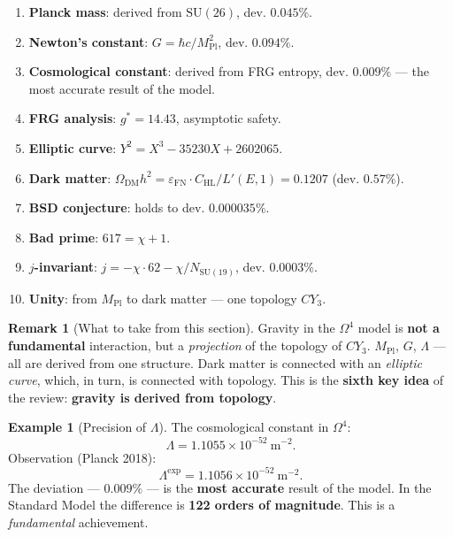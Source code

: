 \documentclass[11pt,a4paper]{article}
\newcommand{\SU}{\mathrm{SU}}
\newcommand{\CY}{CY_3}
\newcommand{\Om}{\Omega^4}
\newcommand{\Mpl}{M_{\text{Pl}}}
\newcommand{\epsFN}{\varepsilon_{\text{FN}}}
\theoremstyle{definition}
\newtheorem{remark}[theorem]{Remark}
\newtheorem{example}[theorem]{Example}
\begin{document}
\begin{enumerate}
    \item \textbf{Planck mass}: derived from $\SU(26)$, 
          dev. $0.045\%$.
    \item \textbf{Newton's constant}: $G = \hbar c/\Mpl^2$, 
          dev. $0.094\%$.
    \item \textbf{Cosmological constant}: derived from 
          FRG entropy, dev. $\mathbf{0.009\%}$ — the most accurate 
          result of the model.
    \item \textbf{FRG analysis}: $g^* = 14.43$, asymptotic 
          safety.
    \item \textbf{Elliptic curve}: 
          $Y^2 = X^3 - 35230X + 2602065$.
    \item \textbf{Dark matter}: $\Omega_{\text{DM}} h^2 
          = \epsFN \cdot C_{\text{HL}}/L'(E,1) = 0.1207$ 
          (dev. $0.57\%$).
    \item \textbf{BSD conjecture}: holds to dev. $0.000035\%$.
    \item \textbf{Bad prime}: $617 = \chi + 1$.
    \item \textbf{$j$-invariant}: 
          $j = -\chi \cdot 62 - \chi/N_{\SU(19)}$, dev. $0.0003\%$.
    \item \textbf{Unity}: from $\Mpl$ to dark matter — 
          one topology $\CY$.
\end{enumerate}

\begin{remark}[What to take from this section]
\label{rem:gravity-takeaway}
Gravity in the $\Om$ model is \textbf{not a fundamental} 
interaction, but a \emph{projection} of the topology of $\CY$. 
$\Mpl$, $G$, $\Lambda$ — all are derived from one structure. 
Dark matter is connected with an \emph{elliptic curve}, which, 
in turn, is connected with topology. This is the \textbf{sixth 
key idea} of the review: \textbf{gravity is derived 
from topology}.
\end{remark}

\begin{example}[Precision of $\Lambda$]
\label{ex:lambda-precision}
The cosmological constant in $\Om$:
\begin{equation}
    \Lambda = 1.1055 \times 10^{-52}~\text{m}^{-2}.
\end{equation}
Observation (Planck 2018):
\begin{equation}
    \Lambda^{\text{exp}} = 1.1056 \times 10^{-52}~\text{m}^{-2}.
\end{equation}
The deviation — $0.009\%$ — is the \textbf{most accurate} result 
of the model. In the Standard Model the difference is 
\textbf{122 orders of magnitude}. This is a \emph{fundamental} achievement.
\end{example}
\end{document}
